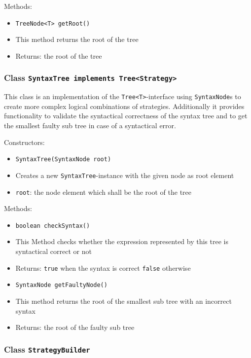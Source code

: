 \documentclass[parskip=full,11pt]{scrartcl}
\begin{document}
Methods:
\begin{itemize}\itemsep -10pt
	\item \texttt{TreeNode<T> getRoot()}
	\item[] This method returns the root of the tree
	\item[] Returns: the root of the tree
\end{itemize}

\subsubsection{Class \texttt{SyntaxTree implements Tree<Strategy>}}

This class is an implementation of the \texttt{Tree<T>}-interface using \texttt{SyntaxNode}s to create more complex logical combinations of strategies. Additionally it provides functionality to validate the syntactical correctness of the syntax tree and to get the smallest faulty sub tree in case of a syntactical error.

Constructors:
\begin{itemize}\itemsep -10pt
	\item \texttt{SyntaxTree(SyntaxNode root)}
	\item[] Creates a new \texttt{SyntaxTree}-instance with the given node as root element
	\item[] \texttt{root}: the node element which shall be the root of the tree
\end{itemize}

Methods:
\begin{itemize} \itemsep -10pt
	\item \texttt{boolean checkSyntax()}
	\item[] This Method checks whether the expression represented by this tree is syntactical correct or not
	\item[] Returns: \texttt{true} when the syntax is correct \texttt{false} otherwise
	
	\item \texttt{SyntaxNode getFaultyNode()}
	\item[] This method returns the root of the smallest sub tree with an incorrect syntax
	\item[] Returns: the root of the faulty sub tree
\end{itemize} 

\subsubsection{Class \texttt{StrategyBuilder}}
\end{document}
